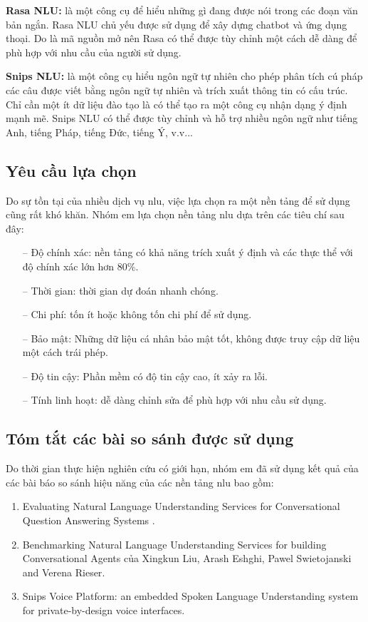 \textbf{Rasa NLU:} là một công cụ để hiểu những gì đang được nói trong các đoạn văn bản ngắn. Rasa NLU chủ yếu được sử dụng để xây dựng chatbot và ứng dụng thoại. Do là mã nguồn mở nên Rasa có thể được tùy chỉnh một cách dễ dàng để phù hợp với nhu cầu của người sử dụng.

\textbf{Snips NLU:}  là một công cụ hiểu ngôn ngữ tự nhiên cho phép phân tích cú pháp các câu được viết bằng ngôn ngữ tự nhiên và trích xuất thông tin có cấu trúc. Chỉ cần một ít dữ liệu đào tạo là có thể tạo ra một công cụ nhận dạng ý định mạnh mẽ. Snips NLU có thể được tùy chỉnh và hỗ trợ nhiều ngôn ngữ như tiếng Anh, tiếng Pháp, tiếng Đức, tiếng Ý, v.v...

\subsection{Yêu cầu lựa chọn}
Do sự tồn tại của nhiều dịch vụ \ac{nlu}, việc lựa chọn ra một nền tảng để sử dụng cũng rất khó khăn. Nhóm em lựa chọn nền tảng \ac{nlu} dựa trên các tiêu chí sau đây:

\begin{itemize}
  \item[--] Độ chính xác: nền tảng có khả năng trích xuất ý định và các thực thể với độ chính xác lớn hơn 80\%.
  \item[--] Thời gian: thời gian dự đoán nhanh chóng.
    \item[--] Chi phí:  tốn ít hoặc không tốn chi phí để sử dụng.
    \item[--] Bảo mật: Những dữ liệu cá nhân bảo mật tốt, không được truy cập dữ liệu một cách trái phép.
    \item[--] Độ tin cậy: Phần mềm có độ tin cậy cao, ít xảy ra lỗi.
    \item[--] Tính linh hoạt: dễ dàng chỉnh sửa để phù hợp với nhu cầu sử dụng. 
\end{itemize}

\subsection{Tóm tắt các bài so sánh được sử dụng}

Do thời gian thực hiện nghiên cứu có giới hạn, nhóm em đã sử dụng kết quả của các bài báo so sánh hiệu năng của các nền tảng \ac{nlu} bao gồm:

\begin{enumerate}
    \item Evaluating Natural Language Understanding Services for Conversational Question Answering Systems \cite{EvaluatingNLU}.
    \item Benchmarking Natural Language Understanding Services for building Conversational Agents của Xingkun Liu, Arash Eshghi, Pawel Swietojanski and Verena Rieser\cite{BenchmarkingNLU}.
    \item Snips Voice Platform: an embedded Spoken Language Understanding system for private-by-design voice interfaces\cite{snips-nlu}.
\end{enumerate}

